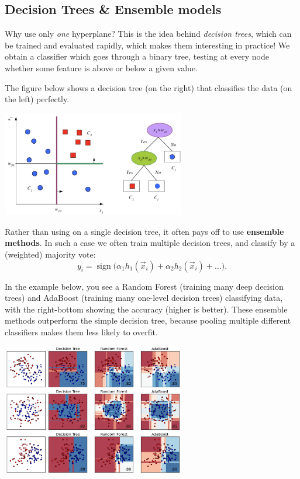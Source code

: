\documentclass{article}
\DeclareMathOperator{\sign}{sign}
\begin{document}
\subsection{Decision Trees \& Ensemble models}
Why use only \textit{one} hyperplane? This is the idea behind \textit{decision trees}, which can be trained and evaluated rapidly, which makes them interesting in practice! We obtain a classifier which goes through a binary tree, testing at every node whether some feature is above or below a given value. 
\begin{testexample}
    The figure below shows a decision tree (on the right) that classifies the data (on the left) perfectly.
    \begin{center}\includegraphics[width=0.6\textwidth]{decisiontree.png}\end{center}
\end{testexample}
%
{\flushleft Rather} than using on a single decision tree, it often pays off to use \textbf{ensemble methods}. In such a case we often train multiple decision trees, and classify by a (weighted) majority vote:
\begin{equation}
    y_i = \sign\Bigg( \alpha_1 h_1(\vec{x}_i) + \alpha_2h_2(\vec{x}_i) + \dots \Bigg).
\end{equation}
\begin{testexample}
    In the example below, you see a Random Forest (training many deep decision trees) and AdaBoost (training many one-level decision trees) classifying data, with the right-bottom showing the accuracy (higher is better). These ensemble methods outperform the simple decision tree, because pooling multiple different classifiers makes them less likely to overfit.
    \begin{center}\includegraphics[width=0.6\textwidth]{ml-classifiers.png}\end{center}
\end{testexample}
\end{document}
